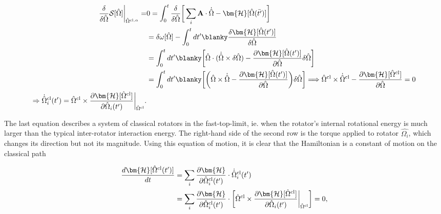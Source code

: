 \begin{equation}
    \begin{split}
        \frac{\delta}{\delta \hat{\Omega}} \mathcal{S}[\hat{\Omega}] \bigg|_{\hat{\Omega}^{\textnormal{cl}, \alpha}} =& 0 = \int_{0}^{t}
        \frac{\delta}{\delta \hat{\Omega}} \bigg[\sum_{i} {\bf A} \cdot \dot{\hat{\Omega}} - \bm{\mathcal{H}}[{\hat{\Omega}}(\bar{t'})]\bigg] \\
        &= \delta \omega[\hat{\Omega}] - \int_0^t dt' \blanky \frac{\delta \bm{\mathcal{H}}[\hat{\Omega}({t'})]}{\delta \hat{\Omega}} \\
        &= \int_0^t dt' \blanky \bigg[{\hat{\Omega}} \cdot (\dot{\hat{\Omega}} \times \delta \hat{\Omega}) - \frac{\partial \bm{\mathcal{H}} [\hat{\Omega}({t'})]}{\partial \hat{\Omega}} \delta \hat{\Omega}\bigg] \\
        &= \int_0^t dt' \blanky \bigg[ \bigg({\hat{\Omega}} \times \dot{\hat{\Omega}} - \frac{\partial \bm{\mathcal{H}} [\hat{\Omega}({t'})]}{\partial \hat{\Omega}}\bigg )  \delta \hat{\Omega}\bigg] \Longrightarrow {\hat{\Omega}}^{\textnormal{cl}} \times \dot{\hat{\Omega}}^{\textnormal{cl}} - \frac{\partial \bm{\mathcal{H}} [\hat{\Omega}^{\textnormal{cl}}]}{\partial \hat{\Omega}} = 0 \\
        \Rightarrow \dot{\hat{\Omega}}^{\textnormal{cl}}_i (t') = \hat{\Omega}^{\textnormal{cl}} \times \frac{\partial \bm{\mathcal{H}} [\hat{\Omega}^{\textnormal{cl}}]}{\partial \hat{\Omega}_i(t')}\bigg|_{\hat{\Omega}^{\textnormal{cl}}}.
    \end{split}
\end{equation}

The last equation describes a system of classical rotators in the fast-top-limit, ie. when the rotator's internal rotational energy is much larger than the typical inter-rotator interaction energy. The right-hand side of the second row is the torque applied to rotator $\hat{\Omega_i}$, which changes its direction but not its magnitude. Using this equation of motion, it is clear that the Hamiltonian is a constant of motion on the classical path 

\begin{equation}
    \begin{split}
        \frac{d \bm{\mathcal{H}} [\hat{\Omega}^{\textnormal{cl}} (t')] }{dt} &= \sum_{i} \frac{\partial \bm{\mathcal{H}}}{\partial \hat{\Omega}_i^{\textnormal{cl}}(t')} \cdot \dot{\hat{\Omega}}_i^{\textnormal{cl}}(t') \\
        &= \sum_{i} \frac{\partial \bm{\mathcal{H}}}{\partial \hat{\Omega}_i^{\textnormal{cl}}(t')} \cdot \bigg[ \hat{\Omega}^{\textnormal{cl}} \times \frac{\partial \bm{\mathcal{H}} [\hat{\Omega}^{\textnormal{cl}}]}{\partial \hat{\Omega}_i(t')}\bigg|_{\hat{\Omega}^{\textnormal{cl}}} \bigg] = 0,
    \end{split}
\end{equation}

